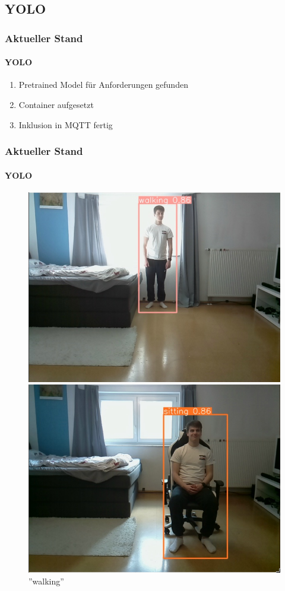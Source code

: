\documentclass[]{beamer}
\begin{document}
\subsection{YOLO}
\begin{frame}
	\frametitle{Aktueller Stand}
	\framesubtitle{YOLO}
	\begin{enumerate}
		\item Pretrained Model für Anforderungen gefunden
		\item Container aufgesetzt
		\item Inklusion in MQTT  fertig
	\end{enumerate}

\end{frame}

\begin{frame}
	\frametitle{Aktueller Stand}
	\framesubtitle{YOLO}
	\begin{figure}
		\centering
		\begin{minipage}[t]{0.3\textwidth}
			\centering
			\includegraphics[width=\textwidth]{Images/walking.png}
			\caption*{''walking''}
		\end{minipage}
		\hfill
		\begin{minipage}[t]{0.3\textwidth}
			\centering
			\includegraphics[width=\textwidth]{Images/sitting.png}

\end{minipage}
\end{figure}
\end{frame}
\end{document}
